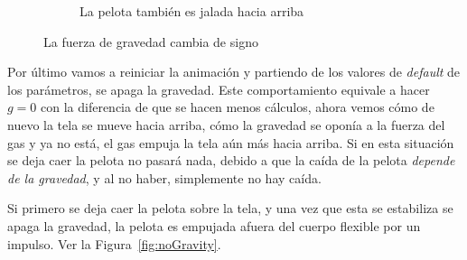 \begin{figure}
\begin{subfigure}[b]{0.45\textwidth}
    \caption{La pelota también es jalada hacia arriba}
    \label{fig:testGpos2}
  \end{subfigure}
 \caption[Experimento: $g > 0$]{La fuerza de gravedad cambia de signo} 
 \label{fig:positiveGravity}
\end{figure}

Por último vamos a reiniciar la animación y partiendo de los valores de \emph{\textenglish{default}} de los parámetros, se apaga la gravedad. 
Este comportamiento equivale a hacer $g=0$ con la diferencia de que se hacen menos cálculos, ahora vemos cómo de nuevo la tela se mueve hacia arriba, cómo la gravedad se oponía a la fuerza del gas y ya no está, el gas empuja la tela aún más hacia arriba.
Si en esta situación se deja caer la pelota no pasará nada, debido a que la caída de la pelota \emph{depende de la gravedad}, y al no haber, simplemente no hay caída.

Si primero se deja caer la pelota sobre la tela, y una vez que esta se estabiliza se apaga la gravedad, la pelota es empujada afuera del cuerpo flexible por un impulso. Ver la Figura~\ref{fig:noGravity}.

